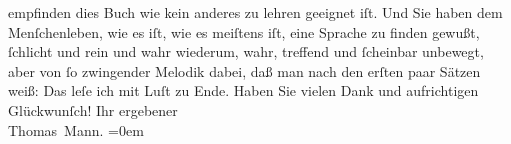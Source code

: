 \begin{ledgroupsized}[t]{13cm}
               empfinden dies Buch wie kein
               anderes zu lehren geeignet iſt. Und Sie haben dem Menſchenleben, wie es iſt, wie es
               meiſtens iſt, eine Sprache zu finden gewußt, ſchlicht und rein und wahr wiederum,
               wahr, treffend und ſcheinbar unbewegt, aber von ſo zwingender Melodik dabei, daß man
               nach den erſten paar Sätzen weiß: Das leſe ich mit Luſt zu Ende. Haben Sie vielen
               Dank und aufrichtigen Glückwunſch!\pend
           \pstart
           Ihr ergebener{\\[\baselineskip]}\spacefill\mbox{Thomas Mann.}\pend
           \leftskip=0em{}
         
         \endnumbering{}\end{ledgroupsized}  \newcommand{\dateiname}{L02501}\newcommand{\titel}{Thomas Mann an Arthur Schnitzler, 28. 5. 1928}\newcommand{\editorInnen}{Martin Anton Müller und Gerd-Hermann Susen}
      